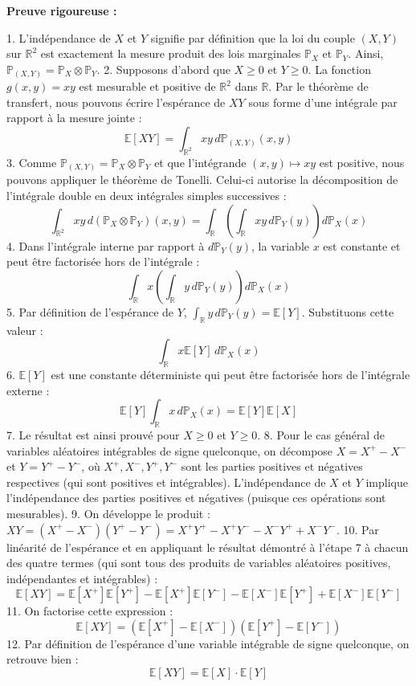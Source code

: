 \documentclass[11pt,a4paper]{article}
\begin{document}
\textbf{Preuve rigoureuse :}

1. L'indépendance de $X$ et $Y$ signifie par définition que la loi du couple $(X,Y)$ sur $\mathbb{R}^2$ est exactement la mesure produit des lois marginales $\mathbb{P}_X$ et $\mathbb{P}_Y$. Ainsi, $\mathbb{P}_{(X,Y)} = \mathbb{P}_X \otimes \mathbb{P}_Y$.
2. Supposons d'abord que $X \geq 0$ et $Y \geq 0$. La fonction $g(x,y) = xy$ est mesurable et positive de $\mathbb{R}^2$ dans $\mathbb{R}$. Par le théorème de transfert, nous pouvons écrire l'espérance de $X Y$ sous forme d'une intégrale par rapport à la mesure jointe :
   $$ \mathbb{E}[XY] = \int_{\mathbb{R}^2} xy \, d\mathbb{P}_{(X,Y)}(x,y) $$
3. Comme $\mathbb{P}_{(X,Y)} = \mathbb{P}_X \otimes \mathbb{P}_Y$ et que l'intégrande $(x,y) \mapsto xy$ est positive, nous pouvons appliquer le théorème de Tonelli. Celui-ci autorise la décomposition de l'intégrale double en deux intégrales simples successives :
   $$ \int_{\mathbb{R}^2} xy \, d(\mathbb{P}_X \otimes \mathbb{P}_Y)(x,y) = \int_{\mathbb{R}} \left( \int_{\mathbb{R}} xy \, d\mathbb{P}_Y(y) \right) d\mathbb{P}_X(x) $$
4. Dans l'intégrale interne par rapport à $d\mathbb{P}_Y(y)$, la variable $x$ est constante et peut être factorisée hors de l'intégrale :
   $$ \int_{\mathbb{R}} x \left( \int_{\mathbb{R}} y \, d\mathbb{P}_Y(y) \right) d\mathbb{P}_X(x) $$
5. Par définition de l'espérance de $Y$, $\int_{\mathbb{R}} y \, d\mathbb{P}_Y(y) = \mathbb{E}[Y]$. Substituons cette valeur :
   $$ \int_{\mathbb{R}} x \mathbb{E}[Y] \, d\mathbb{P}_X(x) $$
6. $\mathbb{E}[Y]$ est une constante déterministe qui peut être factorisée hors de l'intégrale externe :
   $$ \mathbb{E}[Y] \int_{\mathbb{R}} x \, d\mathbb{P}_X(x) = \mathbb{E}[Y]\mathbb{E}[X] $$
7. Le résultat est ainsi prouvé pour $X \geq 0$ et $Y \geq 0$.
8. Pour le cas général de variables aléatoires intégrables de signe quelconque, on décompose $X = X^+ - X^-$ et $Y = Y^+ - Y^-$, où $X^+, X^-, Y^+, Y^-$ sont les parties positives et négatives respectives (qui sont positives et intégrables). L'indépendance de $X$ et $Y$ implique l'indépendance des parties positives et négatives (puisque ces opérations sont mesurables).
9. On développe le produit : $XY = (X^+ - X^-)(Y^+ - Y^-) = X^+ Y^+ - X^+ Y^- - X^- Y^+ + X^- Y^-$.
10. Par linéarité de l'espérance et en appliquant le résultat démontré à l'étape 7 à chacun des quatre termes (qui sont tous des produits de variables aléatoires positives, indépendantes et intégrables) :
    $$ \mathbb{E}[XY] = \mathbb{E}[X^+]\mathbb{E}[Y^+] - \mathbb{E}[X^+]\mathbb{E}[Y^-] - \mathbb{E}[X^-]\mathbb{E}[Y^+] + \mathbb{E}[X^-]\mathbb{E}[Y^-] $$
11. On factorise cette expression :
    $$ \mathbb{E}[XY] = (\mathbb{E}[X^+] - \mathbb{E}[X^-])(\mathbb{E}[Y^+] - \mathbb{E}[Y^-]) $$
12. Par définition de l'espérance d'une variable intégrable de signe quelconque, on retrouve bien :
    $$ \mathbb{E}[XY] = \mathbb{E}[X] \cdot \mathbb{E}[Y] $$
\end{document}
